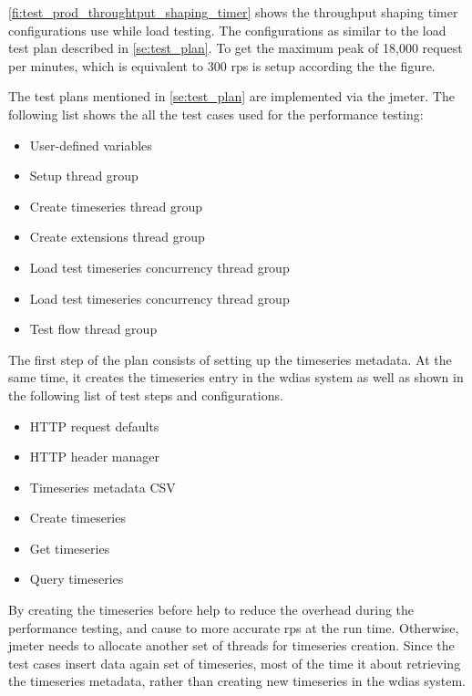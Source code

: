\cref{fi:test_prod_throughtput_shaping_timer} shows the throughput shaping timer configurations use while load testing. The configurations as similar to the load test plan described in \cref{se:test_plan}. To get the maximum peak of 18,000 request per minutes, which is equivalent to 300 \acrshort{rps} is setup according the the figure.

The test plans mentioned in \cref{se:test_plan} are implemented via the \acrshort{jmeter}. The following list shows the all the test cases used for the performance testing:

\begin{itemize}
    \item User-defined variables
    \item Setup thread group
    \item Create timeseries thread group
    \item Create extensions thread group
    \item Load test timeseries concurrency thread group
    \item Load test timeseries concurrency thread group
    \item Test flow thread group
\end{itemize}

The first step of the plan consists of setting up the timeseries metadata. At the same time, it creates the timeseries entry in the \acrshort{wdias} system as well as shown in the following list of test steps and configurations.

\begin{itemize}
    \item HTTP request defaults
    \item HTTP header manager
    \item Timeseries metadata CSV
    \item Create timeseries
    \item Get timeseries
    \item Query timeseries
\end{itemize}

By creating the timeseries before help to reduce the overhead during the performance testing, and cause to more accurate \acrshort{rps} at the run time.
Otherwise, \acrshort{jmeter} needs to allocate another set of threads for timeseries creation. Since the test cases insert data again set of timeseries, most of the time it about retrieving the timeseries metadata, rather than creating new timeseries in the \acrshort{wdias} system.

